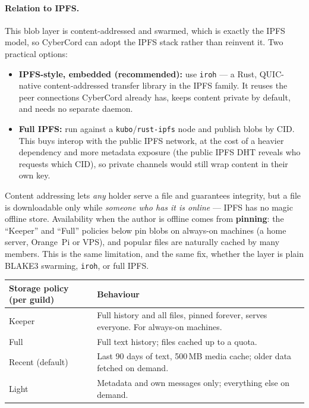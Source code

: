 \documentclass[11pt,a4paper]{article}
\begin{document}
\paragraph{Relation to IPFS.} This blob layer is content-addressed and swarmed, which is
exactly the IPFS model, so CyberCord can adopt the IPFS stack rather than reinvent it.
Two practical options:
\begin{itemize}
  \item \textbf{IPFS-style, embedded (recommended):} use \texttt{iroh} --- a Rust,
        QUIC-native content-addressed transfer library in the IPFS family. It reuses the
        peer connections CyberCord already has, keeps content private by default, and needs
        no separate daemon.
  \item \textbf{Full IPFS:} run against a \texttt{kubo}/\texttt{rust-ipfs} node and publish
        blobs by CID. This buys interop with the public IPFS network, at the cost of a
        heavier dependency and more metadata exposure (the public IPFS DHT reveals who
        requests which CID), so private channels would still wrap content in their own key.
\end{itemize}

\begin{honest}
Content addressing lets \emph{any} holder serve a file and guarantees integrity, but a file
is downloadable only while \emph{someone who has it is online} --- IPFS has no magic offline
store. Availability when the author is offline comes from \textbf{pinning}: the
``Keeper'' and ``Full'' policies below pin blobs on always-on machines (a home server,
Orange~Pi or VPS), and popular files are naturally cached by many members. This is the same
limitation, and the same fix, whether the layer is plain BLAKE3 swarming, \texttt{iroh}, or
full IPFS.
\end{honest}

\begin{center}
\small
\begin{tabularx}{\linewidth}{@{}l Y@{}}
\toprule
\textbf{Storage policy (per guild)} & \textbf{Behaviour} \\
\midrule
Keeper & Full history and all files, pinned forever, serves everyone. For always-on machines. \\
Full   & Full text history; files cached up to a quota. \\
Recent (default) & Last 90 days of text, 500\,MB media cache; older data fetched on demand. \\
Light  & Metadata and own messages only; everything else on demand. \\
\bottomrule
\end{tabularx}
\end{center}
\end{document}
